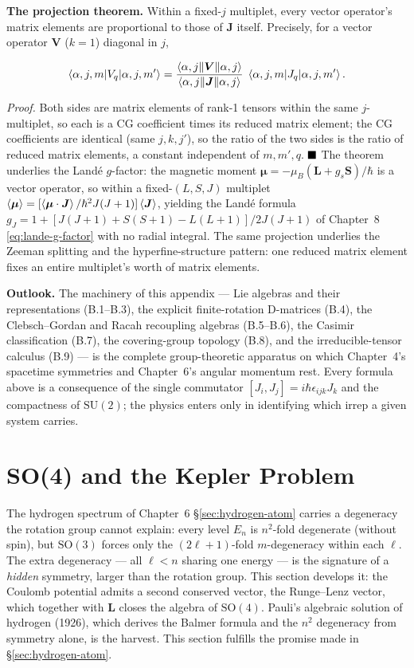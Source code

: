 \medskip\noindent\textbf{The projection theorem.} Within a fixed-$j$ multiplet, every vector operator's matrix elements are proportional to those of $\bm J$ itself. Precisely, for a vector operator $\bm V$ ($k=1$) diagonal in $j$,
\begin{linenomath}
\begin{equation}
\braket{\alpha,j,m|V_{q}|\alpha,j,m'}=\frac{\braket{\alpha,j\|\bm V\|\alpha,j}}{\braket{\alpha,j\|\bm J\|\alpha,j}}\;\braket{\alpha,j,m|J_{q}|\alpha,j,m'}.
\label{eq:projection-theorem}
\end{equation}
\end{linenomath}
\emph{Proof.} Both sides are matrix elements of rank-1 tensors within the same $j$-multiplet, so each is a CG coefficient times its reduced matrix element; the CG coefficients are identical (same $j,k,j'$), so the ratio of the two sides is the ratio of reduced matrix elements, a constant independent of $m,m',q$. $\hfill\blacksquare$ The theorem underlies the Land\'e $g$-factor: the magnetic moment $\bm\mu=-\mu_{B}(\bm L+g_{s}\bm S)/\hbar$ is a vector operator, so within a fixed-$(L,S,J)$ multiplet $\braket{\bm\mu}=[\braket{\bm\mu\cdot\bm J}/\hbar^{2}J(J+1)]\braket{\bm J}$, yielding the Land\'e formula $g_{J}=1+[J(J+1)+S(S+1)-L(L+1)]/2J(J+1)$ of Chapter~8 \eqref{eq:lande-g-factor} with no radial integral. The same projection underlies the Zeeman splitting and the hyperfine-structure pattern: one reduced matrix element fixes an entire multiplet's worth of matrix elements.

\medskip\noindent\textbf{Outlook.} The machinery of this appendix --- Lie algebras and their representations (B.1--B.3), the explicit finite-rotation D-matrices (B.4), the Clebsch--Gordan and Racah recoupling algebras (B.5--B.6), the Casimir classification (B.7), the covering-group topology (B.8), and the irreducible-tensor calculus (B.9) --- is the complete group-theoretic apparatus on which Chapter~4's spacetime symmetries and Chapter~6's angular momentum rest. Every formula above is a consequence of the single commutator $[J_{i},J_{j}]=i\hbar\epsilon_{ijk}J_{k}$ and the compactness of $\mathrm{SU}(2)$; the physics enters only in identifying which irrep a given system carries.

\section{SO(4) and the Kepler Problem}
\label{sec:appendix-so4}

The hydrogen spectrum of Chapter~6 \S\ref{sec:hydrogen-atom} carries a degeneracy the rotation group cannot explain: every level $E_{n}$ is $n^{2}$-fold degenerate (without spin), but $\mathrm{SO}(3)$ forces only the $(2\ell+1)$-fold $m$-degeneracy within each $\ell$. The extra degeneracy --- all $\ell<n$ sharing one energy --- is the signature of a \emph{hidden} symmetry, larger than the rotation group. This section develops it: the Coulomb potential admits a second conserved vector, the Runge--Lenz vector, which together with $\bm L$ closes the algebra of $\mathrm{SO}(4)$. Pauli's algebraic solution of hydrogen (1926), which derives the Balmer formula and the $n^{2}$ degeneracy from symmetry alone, is the harvest. This section fulfills the promise made in \S\ref{sec:hydrogen-atom}.

